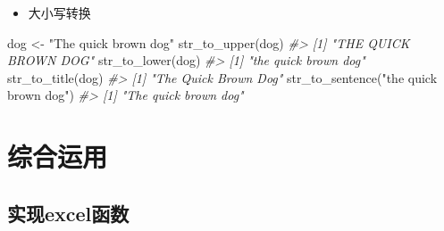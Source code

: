 \documentclass[
]{book}
\newenvironment{Shaded}{\begin{snugshade}}{\end{snugshade}}
\newcommand{\CommentTok}[1]{\textcolor[rgb]{0.56,0.35,0.01}{\textit{#1}}}
\newcommand{\FunctionTok}[1]{\textcolor[rgb]{0.00,0.00,0.00}{#1}}
\newcommand{\NormalTok}[1]{#1}
\newcommand{\OtherTok}[1]{\textcolor[rgb]{0.56,0.35,0.01}{#1}}
\newcommand{\StringTok}[1]{\textcolor[rgb]{0.31,0.60,0.02}{#1}}
\providecommand{\tightlist}{%
  \setlength{\itemsep}{0pt}\setlength{\parskip}{0pt}}
\begin{document}
\begin{Shaded}
\end{Shaded}

\begin{itemize}
\tightlist
\item
  大小写转换
\end{itemize}

\begin{Shaded}
\begin{Highlighting}[]
\NormalTok{dog }\OtherTok{\textless{}{-}} \StringTok{"The quick brown dog"}
\FunctionTok{str\_to\_upper}\NormalTok{(dog)}
\CommentTok{\#\textgreater{} [1] "THE QUICK BROWN DOG"}
\FunctionTok{str\_to\_lower}\NormalTok{(dog)}
\CommentTok{\#\textgreater{} [1] "the quick brown dog"}
\FunctionTok{str\_to\_title}\NormalTok{(dog)}
\CommentTok{\#\textgreater{} [1] "The Quick Brown Dog"}
\FunctionTok{str\_to\_sentence}\NormalTok{(}\StringTok{"the quick brown dog"}\NormalTok{)}
\CommentTok{\#\textgreater{} [1] "The quick brown dog"}
\end{Highlighting}
\end{Shaded}

\hypertarget{character:application}{%
\section{综合运用}\label{character:application}}

\hypertarget{ux5b9eux73b0excelux51fdux6570}{%
\subsection{实现excel函数}\label{ux5b9eux73b0excelux51fdux6570}}
\end{document}
